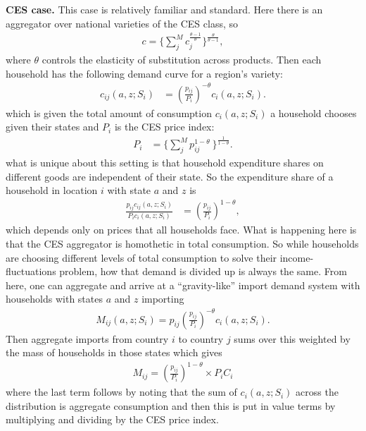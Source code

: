 \documentclass[12pt,pdftex]{article}
\begin{document}
\begin{onehalfspacing}
\textbf{CES case.} This case is relatively familiar and standard. Here there is an aggregator over national varieties of the CES class, so
\begin{align}
c = \bigg \{ \sum_{j}^{M}  c_{j}^{\frac{\theta - 1}{\theta}} \bigg \}^{\frac{\theta}{\theta - 1}},
\label{eq:ces-armington}
\end{align}
where $\theta$ controls the elasticity of substitution across products. Then each household has the following demand curve for a region's variety:
\begin{align}
c_{ij}(a,z; S_i) & = \left(\frac{p_{ij}}{P_i}\right)^{-\theta}c_{i}(a,z; S_i).
\label{eq:ces-demand-curve}
\end{align}
which is given the total amount of consumption $c_{i}(a,z; S_i)$ a household chooses given their states and $P_i$ is the CES price index:
\begin{align}
P_{i} &= \bigg \{ \sum_{j}^{M} p_{ij}^{1 - \theta} \ \bigg \}^{\frac{1}{1-\theta}}.
\label{eq:ces-price-index}
\end{align}
what is unique about this setting is that household expenditure shares on different goods are independent of their state. So the expenditure share of a household in location $i$ with state $a$ and $z$ is
\begin{align}
\frac{p_{ij}c_{ij}(a,z; S_i)}{P_i c_{i}(a,z; S_i)} & = \left(\frac{p_{ij}}{P_i}\right)^{1-\theta},
\label{eq:ces-expenditure-share}
\end{align}
which depends only on prices that all households face. What is happening here is that the CES aggregator is homothetic in total consumption. So while households are choosing different levels of total consumption to solve their income-fluctuations problem, how that demand is divided up is always the same. From here, one can aggregate and arrive at a ``gravity-like'' import demand system with
households with states $a$ and $z$ importing
\begin{align}
M_{ij}(a, z; S_i) = p_{ij} \left(\frac{p_{ij}}{P_i}\right)^{-\theta} c_{i}(a,z; S_i).
\end{align}
Then aggregate imports from country $i$ to country $j$ sums over this weighted by the mass of households in those states which gives
\begin{align}
M_{ij} =  \left(\frac{p_{ij}}{P_i}\right)^{1-\theta} \times P_{i} C_{i}
\end{align}
where the last term follows by noting that the sum of $c_{i}(a,z; S_i)$ across the distribution is aggregate consumption and then this is put in value terms by multiplying and dividing by the CES price index.


\end{onehalfspacing}
\end{document}
